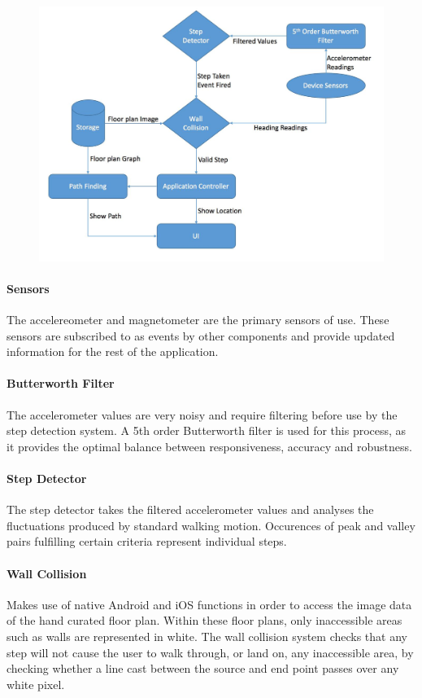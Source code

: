 \documentclass[12pt,a4paper]{report}
\begin{document}
\begin{figure}[h]
\includegraphics[width=\textwidth]{images/appFlow.png}
\label{fig:appFlow}
\end{figure}

\paragraph{Sensors}
The accelereometer and magnetometer are the primary sensors of use. These sensors are subscribed to as events by other components and provide updated information for the rest of the application.

\paragraph{Butterworth Filter}
The accelerometer values are very noisy and require filtering before use by the step detection system. A 5th order Butterworth filter is used for this process, as it provides the optimal balance between responsiveness, accuracy and robustness.

\paragraph{Step Detector}
The step detector takes the filtered accelerometer values and analyses the fluctuations produced by standard walking motion. Occurences of peak and valley pairs fulfilling certain criteria represent individual steps.

\paragraph{Wall Collision}
Makes use of native Android and iOS functions in order to access the image data of the hand curated floor plan. Within these floor plans, only inaccessible areas such as walls are represented in white. The wall collision system checks that any step will not cause the user to walk through, or land on, any inaccessible area, by checking whether a line cast between the source and end point passes over any white pixel.
\end{document}
